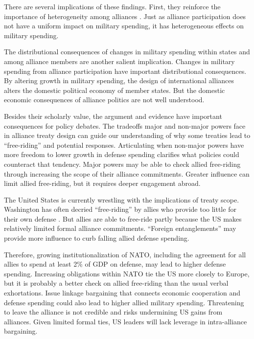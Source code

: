 \documentclass[12pt]{article}
\begin{document}
There are several implications of these findings. 
First, they reinforce the importance of heterogeneity among alliances \citep{Leeds2003, Benson2012, DigiuseppePoast2016}.
Just as alliance participation does not have a uniform impact on military spending, it has heterogeneous effects on military spending. 


The distributional consequences of changes in military spending within states and among alliance members are another salient implication.  
Changes in military spending from alliance participation have important distributional consequences. 
By altering growth in military spending, the design of international alliances alters the domestic political economy of member states. 
But the domestic economic consequences of alliance politics are not well understood. 


Besides their scholarly value, the argument and evidence have important consequences for policy debates. 
The tradeoffs major and non-major powers face in alliance treaty design can guide our understanding of why some treaties lead to ``free-riding'' and potential responses. 
Articulating when non-major powers have more freedom to lower growth in defense spending clarifies what policies could counteract that tendency. 
Major powers may be able to check allied free-riding through increasing the scope of their alliance commitments. 
Greater influence can limit allied free-riding, but it requires deeper engagement abroad. 


The United States is currently wrestling with the implications of treaty scope. 
Washington has often decried ``free-riding'' by allies who provide too little for their own defense \citep{Lanoszka2015}. 
But allies are able to free-ride partly because the US makes relatively limited formal alliance commitments. 
``Foreign entanglements'' may provide more influence to curb falling allied defense spending. 

 
Therefore, growing institutionalization of NATO, including the agreement for all allies to spend at least 2\% of GDP on defense, may lead to higher defense spending.
Increasing obligations within NATO tie the US more closely to Europe, but it is probably a better check on allied free-riding than the usual verbal exhortations. 
Issue linkage bargaining that connects economic cooperation and defense spending could also lead to higher allied military spending.
Threatening to leave the alliance is not credible and risks undermining US gains from alliances. 
Given limited formal ties, US leaders will lack leverage in intra-alliance bargaining. 
\end{document}
